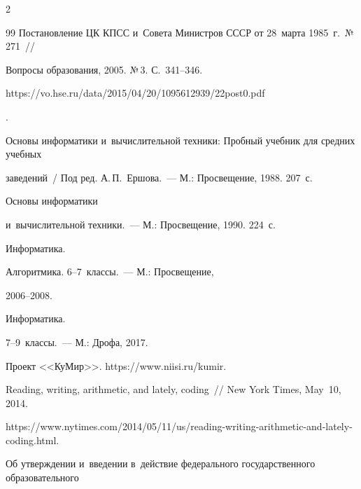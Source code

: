 \begin{multicols}{2}
{{\begin{thebibliography}{99}
Постановление ЦК КПСС и~Совета Министров СССР от 28~марта 1985~г.\ №\,271~// 


Вопросы образования, 2005. №\,3. С.~341--346.


{\sf 


https://vo.\linebreak hse.ru/data/2015/04/20/1095612939/22post0.pdf}.






Основы информатики и~вы\-чис\-ли\-тель\-ной техники: Пробный учебник для средних учебных 


заведений~/ Под ред. А.\,П.~Ершова.~--- М.: Просвещение, 1988. 207~с. 




   Основы информатики 


  и~вычислительной техники.~--- М.: Просвещение, 1990. 224~с. 





  




   Информатика. 


Алгоритмика. 6--7~классы.~--- М.: Просвещение,  


2006--2008. 




   Информатика. 


7--9~классы.~--- М.: Дрофа, 2017. 







  Проект <<КуМир>>. {\sf https://www.niisi.ru/kumir}.




   Reading, writing, arithmetic, and lately, coding~// New York Times, May~10, 2014. 


{\sf https://www.\linebreak nytimes.com/2014/05/11/us/reading-writing-arithmetic-and-lately-coding.html}.




  Об утверждении и~введении в~действие федерального государственного образовательного 



\end{thebibliography}}}
\end{multicols}

